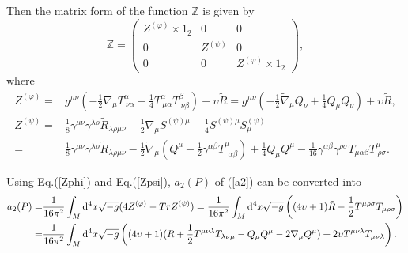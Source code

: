 \documentclass{ptephy}%
\begin{document}
Then the matrix form of the function $\mathbb{Z}$ is given by
\begin{equation}
\mathbb{Z} =
\begin{pmatrix}
Z^{(\varphi)}\times 1_2 & 0 & 0\\
0 & Z^{(\psi)} & 0 \\
0 & 0 & Z^{(\varphi)}\times 1_2
\end{pmatrix}, \label{matrixZ}
\end{equation}
where 
\begin{align}
Z^{(\varphi)}  = & g^{\mu\nu}(-\frac{1}{2}\nabla_\mu T^\alpha_{\ \nu\alpha} -\frac{1}{4}T^\alpha_{\ \mu\alpha}T^\beta_{\ \nu\beta})+\upsilon \tilde{R}
= g^{\mu\nu}(-\frac{1}{2} \tilde{\nabla}_\mu Q_\nu+\frac{1}{4}Q_\mu Q_\nu)+\upsilon\tilde{R},
\label{Zphi} \\
Z^{(\psi)} = & \frac{1}{8}\gamma^{\mu\nu}\gamma^{\lambda\rho}\tilde{R}_{\lambda\rho\mu\nu}
-\frac{1}{2}\nabla_\mu S^{(\psi)\mu}-\frac{1}{4}S^{(\psi)\mu} S^{(\psi)}_\mu \nonumber \\
= & \frac{1}{8}\gamma^{\mu\nu}\gamma^{\lambda\rho} \tilde{R}_{\lambda\rho\mu\nu} 
-\frac{1}{2}\tilde{\nabla}_\mu(Q^\mu -\frac{1}{2}\gamma^{\alpha\beta}T^\mu_{\ \ \alpha\beta}) 
+\frac{1}{4}Q_\mu Q^\mu 
-\frac{1}{16}\gamma^{\alpha\beta}\gamma^{\rho\sigma}T_{\mu\alpha\beta}T^\mu_{\ \rho\sigma}. \label{Zpsi}
\end{align} 

Using Eq.(\ref{Zphi}) and Eq.(\ref{Zpsi}), $a_2(P)$ of (\ref{a2}) can be converted into  
\begin{align}
a_2(P) = & \frac{1}{16\pi^2}\int_M {\rm d}^4x\sqrt{-g}(4 Z^{(\varphi)}-Tr Z^{(\psi)}) 
= \frac{1}{16\pi^2}\int_M {\rm d}^4x \sqrt{-g}\left((4\upsilon+1)\tilde{R} 
- \frac{1}{2}T^{\mu\rho\sigma}T_{\mu\rho\sigma} \right) \nonumber \\
 = & \frac{1}{16\pi^2}\int_M {\rm d}^4x \sqrt{-g}
\left(
(4\upsilon+1)(R+\frac{1}{2}T^{\mu\nu\lambda}T_{\lambda\nu\mu}-Q_\mu Q^\mu -2\nabla_\mu Q^\mu) +2\upsilon T^{\mu\nu\lambda} T_{\mu\nu\lambda}\right).
\label{a2lambda}
\end{align}
 
\end{document}
